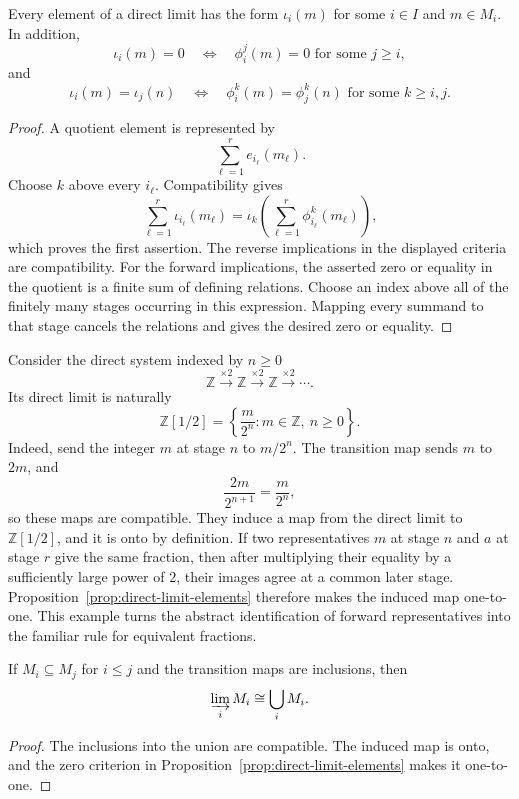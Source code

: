 \begin{proposition}\label{prop:direct-limit-elements}
Every element of a direct limit has the form \(\iota_i(m)\) for some
\(i\in I\) and \(m\in M_i\).  In addition,
\[
\iota_i(m)=0
\quad\Longleftrightarrow\quad
\phi_i^j(m)=0\text{ for some }j\geq i,
\]
and
\[
\iota_i(m)=\iota_j(n)
\quad\Longleftrightarrow\quad
\phi_i^k(m)=\phi_j^k(n)\text{ for some }k\geq i,j.
\]
\end{proposition}
\begin{proof}
A quotient element is represented by
\[
\sum_{\ell=1}^re_{i_\ell}(m_\ell).
\]
Choose \(k\) above every \(i_\ell\).
Compatibility gives
\[
\sum_{\ell=1}^r\iota_{i_\ell}(m_\ell)
=\iota_k\left(\sum_{\ell=1}^r\phi_{i_\ell}^k(m_\ell)\right),
\]
which proves the first assertion.  The reverse implications in the displayed
criteria are compatibility.  For the forward implications, the asserted
zero or equality in the quotient is a finite sum of defining relations.
Choose an index above all of the finitely many stages occurring in this
expression.  Mapping every summand to that stage cancels the relations and
gives the desired zero or equality.
\end{proof}

\begin{example}
Consider the direct system indexed by \(n\geq0\)
\[
\mathbb Z\xrightarrow{\times2}\mathbb Z\xrightarrow{\times2}\mathbb Z
\xrightarrow{\times2}\cdots.
\]
Its direct limit is naturally
\[
\mathbb Z[1/2]
=\left\{\frac{m}{2^n}:m\in\mathbb Z,\ n\geq0\right\}.
\]
Indeed, send the integer \(m\) at stage \(n\) to \(m/2^n\).  The transition
map sends \(m\) to \(2m\), and
\[
\frac{2m}{2^{n+1}}=\frac{m}{2^n},
\]
so these maps are compatible.  They induce a map from the direct limit to
\(\mathbb Z[1/2]\), and it is onto by definition.  If two representatives
\(m\) at stage \(n\) and \(a\) at stage \(r\) give the same fraction, then
after multiplying their equality by a sufficiently large power of \(2\),
their images agree at a common later stage.  Proposition~\ref{prop:direct-limit-elements}
therefore makes the induced map one-to-one.  This example turns the abstract
identification of forward representatives into the familiar rule for
equivalent fractions.
\end{example}

\begin{corollary}
If \(M_i\subseteq M_j\) for \(i\leq j\) and the transition maps are
inclusions, then
\[
\varinjlim_iM_i\cong\bigcup_iM_i.
\]
\end{corollary}
\begin{proof}
The inclusions into the union are compatible.  The induced map is onto, and
the zero criterion in Proposition~\ref{prop:direct-limit-elements} makes it
one-to-one.
\end{proof}


